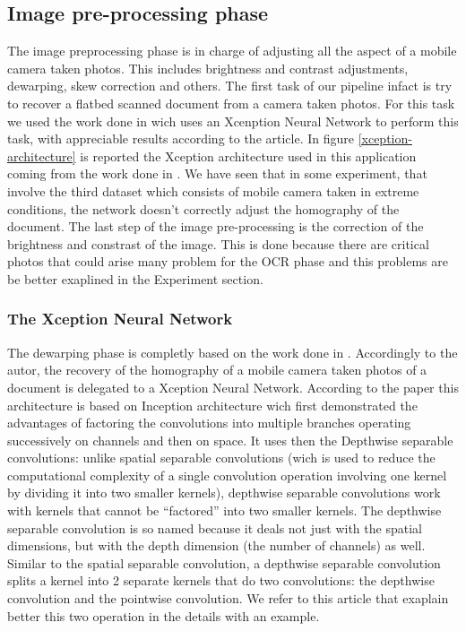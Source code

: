 \documentclass[10pt,twocolumn,letterpaper]{article}
\begin{document}
\subsection{Image pre-processing phase}
The image preprocessing phase is in charge of adjusting all the aspect of a mobile camera taken photos. This includes brightness and contrast adjustments, dewarping, skew correction and others. The first task of our pipeline infact is try to recover a flatbed scanned document from a camera taken photos. For this task we used the work done in \cite{mobile-ocr} wich uses an Xcenption Neural Network \cite{xception_NN} to perform this task, with appreciable results according to the article. In figure \ref{xception-architecture} is reported the Xception architecture used in this application coming from the work done in \cite{Improvingcamera-based}. We have seen that in some experiment, that involve the third dataset which consists of mobile camera taken in extreme conditions, the network doesn't correctly adjust the homography of the document. The last step of the image pre-processing is the correction of the brightness and constrast of the image. This is done because there are critical photos that could arise many problem for the OCR phase and this problems are be better exaplined in the Experiment section.

\subsubsection{The Xception Neural Network}
The dewarping phase is completly based on the work done in \cite{mobile-ocr}. Accordingly to the autor, the recovery of the homography of a mobile camera taken photos of a document is delegated to a Xception Neural Network. According to the paper \cite{xception} this architecture is based on Inception architecture wich first demonstrated the advantages of factoring the convolutions into multiple branches operating successively on channels and then on space. It uses then the Depthwise separable convolutions: unlike spatial separable convolutions (wich is used to reduce the computational complexity of a single convolution operation involving one kernel by dividing it into two smaller kernels), depthwise separable convolutions work with kernels that cannot be “factored” into two smaller kernels. The depthwise separable convolution is so named because it deals not just with the spatial dimensions, but with the depth dimension (the number of channels) as well. Similar to the spatial separable convolution, a depthwise separable convolution splits a kernel into 2 separate kernels that do two convolutions: the depthwise convolution and the pointwise convolution. We refer to this article \cite{https://towardsdatascience.com/a-basic-introduction-to-separable-convolutions-b99ec3102728} that exaplain better this two operation in the details with an example.\\
\end{document}
